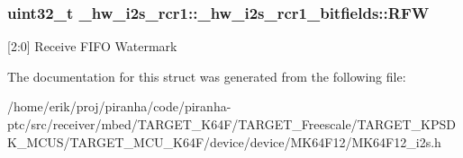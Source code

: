 \subsubsection[{\texorpdfstring{R\+FW}{RFW}}]{\setlength{\rightskip}{0pt plus 5cm}uint32\+\_\+t \+\_\+hw\+\_\+i2s\+\_\+rcr1\+::\+\_\+hw\+\_\+i2s\+\_\+rcr1\+\_\+bitfields\+::\+R\+FW}\hypertarget{struct__hw__i2s__rcr1_1_1__hw__i2s__rcr1__bitfields_ac0ac712962f07fcb79ceeb2551435b7f}{}\label{struct__hw__i2s__rcr1_1_1__hw__i2s__rcr1__bitfields_ac0ac712962f07fcb79ceeb2551435b7f}
\mbox{[}2\+:0\mbox{]} Receive F\+I\+FO Watermark 

The documentation for this struct was generated from the following file\+:\begin{DoxyCompactItemize}
\item 
/home/erik/proj/piranha/code/piranha-\/ptc/src/receiver/mbed/\+T\+A\+R\+G\+E\+T\+\_\+\+K64\+F/\+T\+A\+R\+G\+E\+T\+\_\+\+Freescale/\+T\+A\+R\+G\+E\+T\+\_\+\+K\+P\+S\+D\+K\+\_\+\+M\+C\+U\+S/\+T\+A\+R\+G\+E\+T\+\_\+\+M\+C\+U\+\_\+\+K64\+F/device/device/\+M\+K64\+F12/M\+K64\+F12\+\_\+i2s.\+h\end{DoxyCompactItemize}

